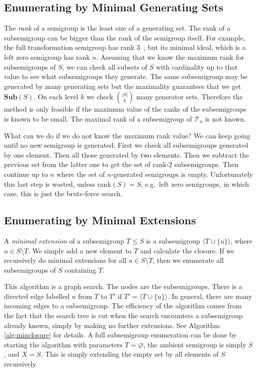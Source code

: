 \documentclass{amsart}
\newcommand{\cT}{{\mathcal T}}
\newcommand{\Sub}{\mathbf{Sub}}
\theoremstyle{plain}
\theoremstyle{definition}
\begin{document}
\subsection{Enumerating by Minimal Generating Sets}
\label{sec:mingen}
The \emph{rank} of a semigroup is the least size of a  generating set.
The rank of a subsemigroup can be bigger than the rank of the semigroup itself.
For example, the full transformation semigroup has rank 3~\cite{ClassicalTransSemigroups2009}, but its minimal ideal, which is a left zero semigroup has rank $n$. 
Assuming that we know the maximum rank for subsemigroups of $S$, we can check all subsets of $S$ with cardinality up to that value to see what subsemigroups they generate.
The same subsemigroup may be generated by many generating sets but the maximality guarantees that we get $\Sub(S)$.
On each level $k$ we check $\binom{|S|}{k}$ many generator sets.
Therefore the method is only feasible if the maximum value of the ranks of the subsemigroups is known to be small.
The maximal rank of a subsemigroup of $\cT_n$ is not known. %

What can we do if we do not know the maximum rank value?
We can keep going until no new semigroup is generated.
First we check all subsemigroups generated by one element.
Then all those generated by two elements.
Then we subtract the previous set from the latter one to get the set of rank-2 subsemigroups.
Then continue up to $n$ where the set of $n$-generated semigroups is empty.
Unfortunately this last step is wasted, unless rank$(S)=S$, e.g.~left zero
semigroups, in which case, this is just the brute-force search.


\subsection{Enumerating by Minimal Extensions}
\label{sec:minext}

A \emph{minimal extension} of a subsemigroup $T\leq S$ is a subsemigroup $\langle T\cup\{u\}\rangle$, where $u\in S\setminus T$.
We simply add a new element to $T$ and calculate the closure.
If we recursively do minimal extensions for all $u\in S\setminus T$, then we enumerate all subsemigroups of $S$ containing $T$.

This algorithm is a graph search.
The nodes are the subsemigroups.
There is a directed edge labelled $u$ from $T$ to $T'$ if $T'=\langle T\cup\{u\}\rangle$.
In general, there are many incoming edges to a subsemigroup.
The efficiency of the algorithm  comes from the fact that the search tree is cut when the search encounters a subsemigroup already known, simply by making no further extensions.
See Algorithm \ref{alg:minclosure} for details.
A full subsemigroup enumeration can be done by starting the algorithm with parameters $T=\varnothing$, the ambient semigroup is simply $S$, and  $X=S$.
This is simply extending the empty set by all elements of $S$ recursively.
\end{document}
